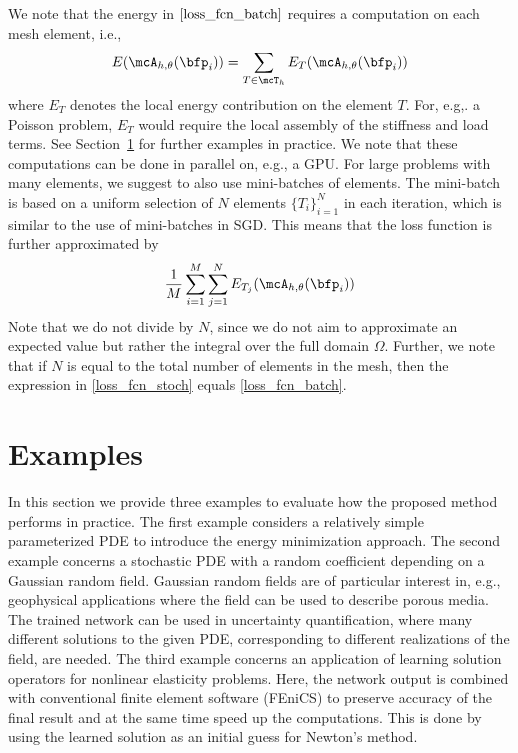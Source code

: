\documentclass[12pt]{article}
\begin{document}
We note that the energy in $\eqref{loss_fcn_batch}$ requires a computation on each mesh element, i.e.,
\begin{align}
	 E(\mcA_{h,\theta}(\bfp_i)) = \sum_{T \in \mcT_h} E_T(\mcA_{h,\theta}(\bfp_i))
\end{align}
where $E_T$ denotes the local energy contribution on the element $T$. For, e.g,. a Poisson problem, $E_T$ would require the local assembly of the stiffness and load terms. See Section~\ref{sec:examples} for further examples in practice. We note that these computations can be done in parallel on, e.g., a GPU. For large problems with many elements, we suggest to also use mini-batches of elements. The mini-batch is based on a uniform selection of $N$ elements $\{T_i\}_{i=1}^N$ in each iteration, which is similar to the use of mini-batches in SGD. This means that the loss function is further approximated by
\begin{align}
	\frac{1}{M}\sum_{i=1}^M \sum_{j=1}^N E_{T_j}(\mcA_{h,\theta}(\bfp_i)) \label{loss_fcn_stoch}
\end{align}
Note that we do not divide by $N$, since we do not aim to approximate an expected value but rather the integral over the full domain $\Omega$. Further, we note that if $N$ is equal to the total number of elements in the mesh, then the expression in \eqref{loss_fcn_stoch} equals \eqref{loss_fcn_batch}.

\section{Examples}\label{sec:examples}
In this section we provide three examples to evaluate how the proposed method performs in practice. The first example considers a relatively simple parameterized PDE to introduce the energy minimization approach. The second example concerns a stochastic PDE with a random coefficient depending on a Gaussian random field. Gaussian random fields are of particular interest in, e.g., geophysical applications where the field can be used to describe porous media. The trained network can be used in uncertainty quantification, where many different solutions to the given PDE, corresponding to different realizations of the field, are needed. The third example concerns an application of learning solution operators for nonlinear elasticity problems. Here, the network output is combined with conventional finite element software (FEniCS) to preserve accuracy of the final result and at the same time speed up the computations. This is done by using the learned solution as an initial guess for Newton's method.
\end{document}

